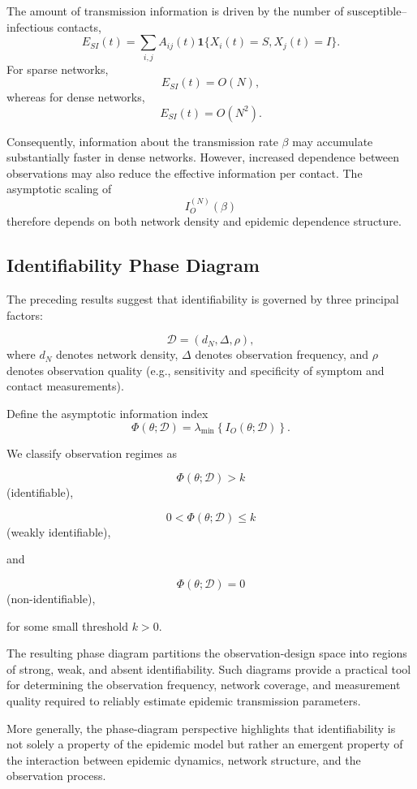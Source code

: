\documentclass[10pt]{article}
\begin{document}
The amount of transmission information is driven by the number of susceptible--infectious contacts,
\[
E_{SI}(t)
=
\sum_{i,j}
A_{ij}(t)
\mathbf{1}\{X_i(t)=S,X_j(t)=I\}.
\]
For sparse networks,
\[
E_{SI}(t)=O(N),
\]
whereas for dense networks,
\[
E_{SI}(t)=O(N^2).
\]

Consequently, information about the transmission rate $\beta$ may accumulate substantially faster in dense networks. However, increased dependence between observations may also reduce the effective information per contact. The asymptotic scaling of
\[
I_O^{(N)}(\beta)
\]
therefore depends on both network density and epidemic dependence structure.

\subsection{Identifiability Phase Diagram}

The preceding results suggest that identifiability is governed by three principal factors:

\[
\mathcal{D}
=
(d_N,\Delta,\rho),
\]
where $d_N$ denotes network density, $\Delta$ denotes observation frequency, and $\rho$ denotes observation quality (e.g., sensitivity and specificity of symptom and contact measurements).

Define the asymptotic information index
\[
\Phi(\theta;\mathcal{D})
=
\lambda_{\min}
\left\{
I_O(\theta;\mathcal{D})
\right\}.
\]

We classify observation regimes as

\[
\Phi(\theta;\mathcal{D})>k
\]
(identifiable),

\[
0<\Phi(\theta;\mathcal{D})\le k
\]
(weakly identifiable),

and

\[
\Phi(\theta;\mathcal{D})=0
\]
(non-identifiable),

for some small threshold $k>0$.

The resulting phase diagram partitions the observation-design space into regions of strong, weak, and absent identifiability. Such diagrams provide a practical tool for determining the observation frequency, network coverage, and measurement quality required to reliably estimate epidemic transmission parameters.

More generally, the phase-diagram perspective highlights that identifiability is not solely a property of the epidemic model but rather an emergent property of the interaction between epidemic dynamics, network structure, and the observation process.
\end{document}
